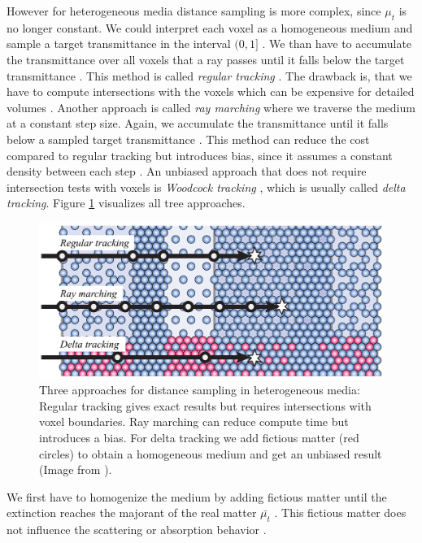 However for heterogeneous media distance sampling is more complex, since $\mu_t$ is no longer constant.
We could interpret each voxel as a homogeneous medium and sample a target transmittance in the interval $(0, 1]$ \cite{novak_overview}.
We than have to accumulate the transmittance over all voxels that a ray passes until it falls below the target transmittance \cite{novak_overview}.
This method is called \textit{regular tracking} \cite{sutton_regular_tracking}.
The drawback is, that we have to compute intersections with the voxels which can be expensive for detailed volumes \cite{novak_overview}.
Another approach is called \textit{ray marching} \cite{perlin_hypertexture} where we traverse the medium at a constant step size.
Again, we accumulate the transmittance until it falls below a sampled target transmittance \cite{novak_overview}.
This method can reduce the cost compared to regular tracking but introduces bias, since it assumes a constant density between each step \cite{novak_overview}.
An unbiased approach that does not require intersection tests with voxels is \textit{Woodcock tracking} \cite{woodcock}, which is usually called \textit{delta tracking}.
Figure \ref{fig:novak_distance_sampling} visualizes all tree approaches.
\begin{figure}[ht]
    \centering
    \includegraphics[width=0.7\linewidth]{img/novak_distance_sampling.png}
    \caption[Approaches for distance sampling in heterogeneous media]{Three approaches for distance sampling in heterogeneous media: Regular tracking gives exact results but requires intersections with voxel boundaries. Ray marching can reduce compute time but introduces a bias. For delta tracking we add fictious matter (red circles) to obtain a homogeneous medium and get an unbiased result (Image from \cite{novak_overview}).}
    \label{fig:novak_distance_sampling}
\end{figure}
We first have to homogenize the medium by adding fictious matter until the extinction reaches the majorant of the real matter $\bar{\mu_t}$ \cite{novak_overview}.
This fictious matter does not influence the scattering or absorption behavior \cite{novak_overview}.
